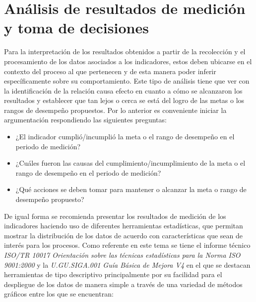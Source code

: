 \documentclass[
]{book}
\providecommand{\tightlist}{%
  \setlength{\itemsep}{0pt}\setlength{\parskip}{0pt}}
\begin{document}
\hypertarget{anuxe1lisis-de-resultados-de-mediciuxf3n-y-toma-de-decisiones}{%
\chapter{Análisis de resultados de medición y toma de decisiones}\label{anuxe1lisis-de-resultados-de-mediciuxf3n-y-toma-de-decisiones}}

Para la interpretación de los resultados obtenidos a partir de la recolección y el procesamiento de los datos asociados a los indicadores, estos deben ubicarse en el contexto del proceso al que pertenecen y de esta manera poder inferir específicamente sobre su comportamiento. Este tipo de análisis tiene que ver con la identificación de la relación causa efecto en cuanto a cómo se alcanzaron los resultados y establecer que tan lejos o cerca se está del logro de las metas o los rangos de desempeño propuestos. Por lo anterior es conveniente iniciar la argumentación respondiendo las siguientes preguntas:

\begin{itemize}
\tightlist
\item
  ¿El indicador cumplió/incumplió la meta o el rango de desempeño en el periodo de medición?
\item
  ¿Cuáles fueron las causas del cumplimiento/incumplimiento de la meta o el rango de desempeño en el periodo de medición?
\item
  ¿Qué acciones se deben tomar para mantener o alcanzar la meta o rango de desempeño propuesto?
\end{itemize}

De igual forma se recomienda presentar los resultados de medición de los indicadores haciendo uso de diferentes herramientas estadísticas, que permitan mostrar la distribución de los datos de acuerdo con características que sean de interés para los procesos. Como referente en este tema se tiene el informe técnico \emph{ISO/TR 10017 Orientación sobre las técnicas estadísticas para la Norma ISO 9001:2000} y la \emph{U.GU.SIGA.001 Guía Básica de Mejora V4} en el que se destacan herramientas de tipo descriptivo principalmente por su facilidad para el despliegue de los datos de manera simple a través de una variedad de métodos gráficos entre los que se encuentran:
\end{document}
